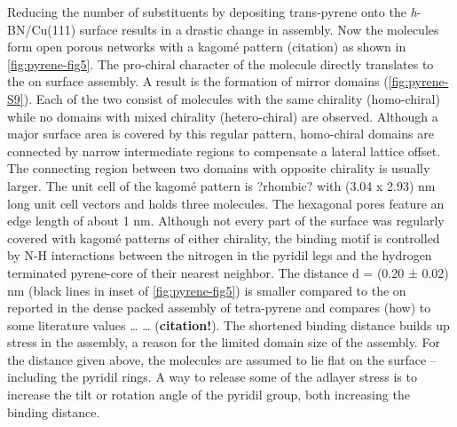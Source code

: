 Reducing the number of substituents by depositing trans-pyrene onto the \textit{h}-BN/Cu(111) surface results in a drastic change in assembly. Now the molecules form open porous networks with a kagom\'e pattern (citation) as shown in \autoref{fig:pyrene-fig5}. The pro-chiral character of the molecule directly translates to the on surface assembly. A result is the formation of mirror domains (\autoref{fig:pyrene-S9}). Each of the two consist of molecules with the same chirality (homo-chiral) while no domains with mixed chirality (hetero-chiral) are observed. Although a major surface area is covered by this regular pattern, homo-chiral domains are connected by narrow intermediate regions to compensate a lateral lattice offset. The connecting region between two domains with opposite chirality is usually larger. The unit cell of the kagom\'e pattern is ?rhombic? with (3.04 x 2.93) nm long unit cell vectors and holds three molecules. The hexagonal pores feature an edge length of about 1 nm. Although not every part of the surface was regularly covered with kagom\'e patterns of either chirality, the binding motif is controlled by N-H interactions between the nitrogen in the pyridil legs and the hydrogen terminated pyrene-core of their nearest neighbor. The distance d = (0.20 ± 0.02) nm (black lines in inset of \autoref{fig:pyrene-fig5}) is smaller compared to the on reported in the dense packed assembly of tetra-pyrene and compares (how) to some literature values … … (\textbf{citation!}). The shortened binding distance builds up stress in the assembly, a reason for the limited domain size of the assembly. For the distance given above, the molecules are assumed to lie flat on the surface – including the pyridil rings. A way to release some of the adlayer stress is to increase the tilt or rotation angle of the pyridil group, both increasing the binding distance.


